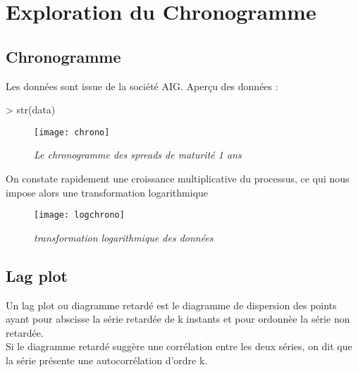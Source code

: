 \section{Exploration du Chronogramme} 
\subsection*{Chronogramme} 
Les données sont issue de la société AIG.  
Aperçu des données :


\begin{Schunk} 
\begin{Sinput} 
> str(data)
\end{Sinput}
\end{Schunk}

\begin{figure}[H]
    \centering
    \label{fig:chrono} 
    \texttt{[image: chrono]} 
    \caption{\it Le chronogramme des spreads de maturité 1 ans } 
 \end{figure} 
        
 On constate rapidement une croissance multiplicative du processus, ce qui nous impose alors une transformation 
 logarithmique
    \begin{figure}[H]
    \centering
        \label{fig:logchrono} 
         \texttt{[image: logchrono]} 
         \caption{\it transformation logarithmique des données} 
     \end{figure} 

\subsection{Lag plot}
Un lag plot ou diagramme retardé est le diagramme de dispersion 
des points ayant pour abscisse la série retardée de k instants 
et pour ordonnèe la série non retardée.\\ 
Si le diagramme retardé suggère une corrélation entre les deux séries, 
on dit que la série présente une autocorrélation d’ordre k.

